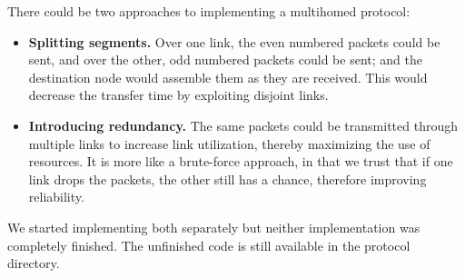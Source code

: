\documentclass[conference]{IEEEtran}
\begin{document}
There could be two approaches to implementing a multihomed protocol:

\begin{itemize}
    \item \textbf{Splitting segments.} Over one link, the even numbered packets could be sent, and
    over the other, odd numbered packets could be sent; and the destination node would assemble them
    as they are received. This would decrease the transfer time by exploiting disjoint links.
    \item \textbf{Introducing redundancy.} The same packets could be transmitted through multiple
    links to increase link utilization, thereby maximizing the use of resources. It is more like a
    brute-force approach, in that we trust that if one link drops the packets, the other still has
    a chance, therefore improving reliability.
\end{itemize}

We started implementing both separately but neither implementation was completely finished. The
unfinished code is still available in the protocol directory.
\end{document}
